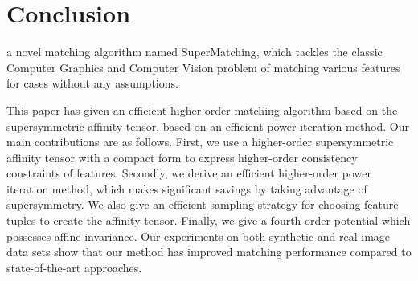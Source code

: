 \section{Conclusion}
\label{sec:conclusion}
a novel matching algorithm named SuperMatching, which tackles the classic Computer Graphics and Computer Vision problem of matching various features for cases without any assumptions.

This paper has given an efficient higher-order matching algorithm based on the supersymmetric affinity tensor, based on an efficient power iteration method. Our main contributions are as follows.
First, we use a  higher-order supersymmetric affinity tensor with a compact form to express higher-order consistency constraints of features. Secondly, we derive an efficient higher-order power iteration method, which makes significant savings by taking advantage of supersymmetry. We also give an efficient sampling strategy for choosing feature tuples to create the affinity tensor. Finally, we give a fourth-order potential which possesses affine invariance. Our experiments on both synthetic and real image data sets show that our method has improved matching performance compared to state-of-the-art approaches.

